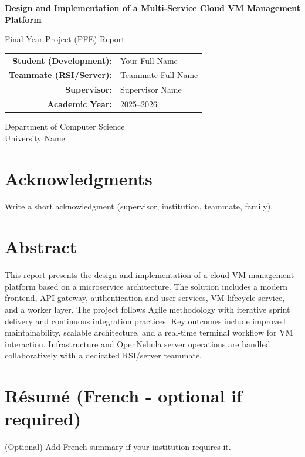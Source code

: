 \documentclass[12pt,a4paper]{report}
\newcommand{\projectTitle}{Design and Implementation of a Multi-Service Cloud VM Management Platform}
\newcommand{\studentName}{Your Full Name}
\newcommand{\teammateName}{Teammate Full Name}
\newcommand{\supervisorName}{Supervisor Name}
\newcommand{\academicYear}{2025--2026}
\begin{document}
\begin{titlepage}
    \centering
    \vspace*{2cm}
    {\Huge \textbf{\projectTitle} \par}
    \vspace{1.5cm}
    {\Large Final Year Project (PFE) Report\par}
    \vspace{2cm}
    \begin{tabular}{rl}
        \textbf{Student (Development):} & \studentName \\
        \textbf{Teammate (RSI/Server):} & \teammateName \\
        \textbf{Supervisor:} & \supervisorName \\
        \textbf{Academic Year:} & \academicYear \\
    \end{tabular}
    \vfill
    {\large Department of Computer Science\\
    University Name}
\end{titlepage}

\chapter*{Acknowledgments}
Write a short acknowledgment (supervisor, institution, teammate, family).

\chapter*{Abstract}
This report presents the design and implementation of a cloud VM management platform based on a microservice architecture.
The solution includes a modern frontend, API gateway, authentication and user services, VM lifecycle service, and a worker layer.
The project follows Agile methodology with iterative sprint delivery and continuous integration practices.
Key outcomes include improved maintainability, scalable architecture, and a real-time terminal workflow for VM interaction.
Infrastructure and OpenNebula server operations are handled collaboratively with a dedicated RSI/server teammate.

\chapter*{Résumé (French - optional if required)}
(Optional) Add French summary if your institution requires it.
\end{document}
